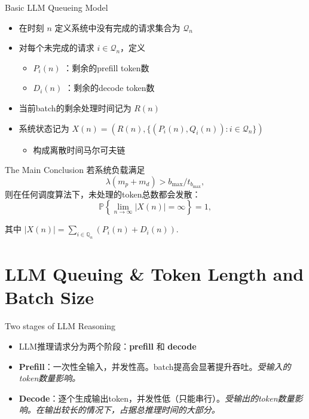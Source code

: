 \documentclass{beamer}
\begin{document}
\begin{frame}{Basic LLM Queueing Model}
    \begin{itemize}[<+-| alert@+>] 
        \item 在时刻 $n$ 定义系统中没有完成的请求集合为 $\mathcal{Q}_n$
        \item 对每个未完成的请求 $i\in \mathcal{Q}_n$，定义
            \begin{itemize}
                \item $P_i(n)$ ：剩余的prefill token数
                \item $D_i(n)$ ：剩余的decode token数
            \end{itemize}
        \item 当前batch的剩余处理时间记为 $R(n)$ 
        \item 系统状态记为 $X(n)=\left( R(n),\{(P_i(n),Q_i(n)):i\in \mathcal{Q}_n\}\right)$ 
        \begin{itemize}
            \item 构成离散时间马尔可夫链
        \end{itemize}
    \end{itemize}
\end{frame}

\begin{frame}{The Main Conclusion}
    若系统负载满足
    \[
    \lambda(m_p + m_d) > b_{\text{max}} / t_{b_{\text{max}}},
    \]
    则在任何调度算法下，未处理的token总数都会发散：
    \[
    \mathbb{P}\left\{ \lim_{n \to \infty} |X(n)| = \infty \right\} = 1,
    \]

    其中 \( |X(n)| = \sum_{i \in \mathbb{Q}_n} (P_i(n) + D_i(n)) \).
\end{frame}


\section{LLM Queuing & Token Length and Batch Size}

\begin{frame}{Two stages of LLM Reasoning}
    \begin{itemize}
        \item LLM推理请求分为两个阶段：\textbf{prefill} 和 \textbf{decode}
        \item \textbf{Prefill}：一次性全输入，并发性高。batch提高会显著提升吞吐。\emph{受输入的token数量影响。}
        \item \textbf{Decode}：逐个生成输出token，并发性低（只能串行）。\emph{受输出的token数量影响。在输出较长的情况下，占据总推理时间的大部分。}
    \end{itemize}
\end{frame}
\end{document}
